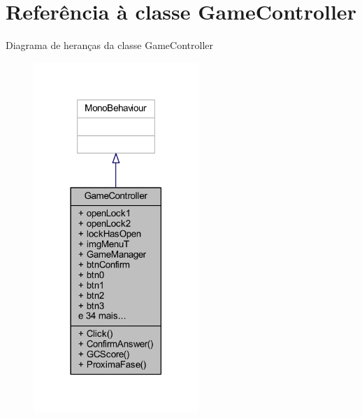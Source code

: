 \section{Referência à classe Game\+Controller}
\label{class_game_controller}


Diagrama de heranças da classe Game\+Controller
\nopagebreak
\begin{figure}[H]
\begin{center}
\leavevmode
\includegraphics[width=177pt]{class_game_controller__inherit__graph}
\end{center}
\end{figure}


